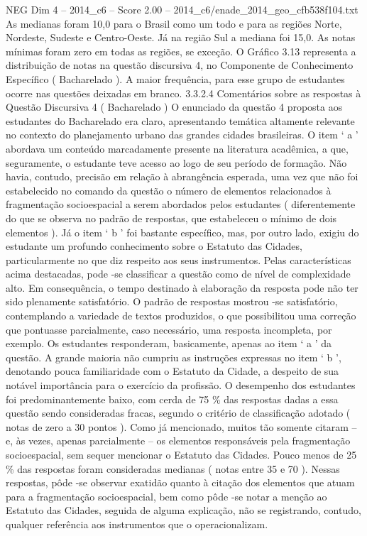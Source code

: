 \begin{textsample}{NEG Dim 4 – 2014\_c6 – Score 2.00 – 2014\_c6/enade\_2014\_geo\_cfb538f104.txt}
As medianas foram 10,0 para o Brasil como um todo e para as regiões Norte, Nordeste, Sudeste e Centro-Oeste.
Já na região Sul a mediana foi 15,0.
As notas mínimas foram zero em todas as regiões, se exceção.
O Gráfico 3.13 representa a distribuição de notas na questão discursiva 4, no Componente de Conhecimento Específico ( Bacharelado ).
A maior frequência, para esse grupo de estudantes ocorre nas questões deixadas em branco. 3.3.2.4 Comentários sobre as respostas à Questão Discursiva 4 ( Bacharelado ) O enunciado da questão 4 proposta aos estudantes do Bacharelado era claro, apresentando temática altamente relevante no contexto do planejamento urbano das grandes cidades brasileiras.
O item ‘ a ’ abordava um conteúdo marcadamente presente na literatura acadêmica, a que, seguramente, o estudante teve acesso ao logo de seu período de formação.
Não havia, contudo, precisão em relação à abrangência esperada, uma vez que não foi estabelecido no comando da questão o número de elementos relacionados à fragmentação socioespacial a serem abordados pelos estudantes ( diferentemente do que se observa no padrão de respostas, que estabeleceu o mínimo de dois elementos ).
Já o item ‘ b ’ foi bastante específico, mas, por outro lado, exigiu do estudante um profundo conhecimento sobre o Estatuto das Cidades, particularmente no que diz respeito aos seus instrumentos.
Pelas características acima destacadas, pode -se classificar a questão como de nível de complexidade alto.
Em consequência, o tempo destinado à elaboração da resposta pode não ter sido plenamente satisfatório.
O padrão de respostas mostrou -se satisfatório, contemplando a variedade de textos produzidos, o que possibilitou uma correção que pontuasse parcialmente, caso necessário, uma resposta incompleta, por exemplo.
Os estudantes responderam, basicamente, apenas ao item ‘ a ’ da questão.
A grande maioria não cumpriu as instruções expressas no item ‘ b ’, denotando pouca familiaridade com o Estatuto da Cidade, a despeito de sua notável importância para o exercício da profissão.
O desempenho dos estudantes foi predominantemente baixo, com cerda de 75 \% das respostas dadas a essa questão sendo consideradas fracas, segundo o critério de classificação adotado ( notas de zero a 30 pontos ).
Como já mencionado, muitos tão somente citaram – e, às vezes, apenas parcialmente – os elementos responsáveis pela fragmentação socioespacial, sem sequer mencionar o Estatuto das Cidades.
Pouco menos de 25 \% das respostas foram consideradas medianas ( notas entre 35 e 70 ).
Nessas respostas, pôde -se observar exatidão quanto à citação dos elementos que atuam para a fragmentação socioespacial, bem como pôde -se notar a menção ao Estatuto das Cidades, seguida de alguma explicação, não se registrando, contudo, qualquer referência aos instrumentos que o operacionalizam.

\end{textsample}
